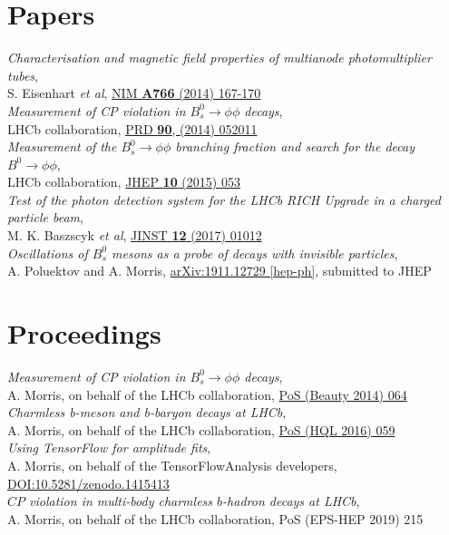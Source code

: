 \documentclass[contbibnum,titleabove]{simplecv}
\begin{document}
	\section{Papers}
	\vspace{0.5em}
		\textit{Characterisation and magnetic field properties of multianode photomultiplier tubes},\\ S. Eisenhart \textit{et al}, \href{http://dx.doi.org/10.1016/j.nima.2014.05.036}{NIM \textbf{A766} (2014) 167-170}\\[1ex]
		\textit{Measurement of CP violation in $B^0_s \to \phi\phi$ decays},\\ LHCb collaboration, \href{http://dx.doi.org/10.1103/PhysRevD.90.052011}{PRD \textbf{90}, (2014) 052011}\\[1ex]
		\textit{Measurement of the $B^0_s \to \phi\phi$ branching fraction and search for the decay $B^0 \to \phi \phi$},\\ LHCb collaboration, \href{http://dx.doi.org/10.1007/JHEP10(2015)053}{JHEP \textbf{10} (2015) 053}\\[1ex]
		\textit{Test of the photon detection system for the LHCb RICH Upgrade in a charged particle beam},\\ M. K. Baszscyk \textit{et al}, \href{http://cds.cern.ch/record/2197586}{JINST \textbf{12} (2017) 01012}\\[1ex]
		\textit{Oscillations of $B_s^0$ mesons as a probe of decays with invisible particles},\\ A. Poluektov and A. Morris, \href{https://arxiv.org/abs/1911.12729}{arXiv:1911.12729 [hep-ph]}, submitted to JHEP
	\section{Proceedings}
	\vspace{0.5em}
		\textit{Measurement of CP violation in $B^0_s \to \phi\phi$ decays},\\ A. Morris, on behalf of the LHCb collaboration, \href{https://pos.sissa.it/cgi-bin/reader/contribution.cgi?id=216/064}{PoS (Beauty 2014) 064}\\[1ex]
		\textit{Charmless b-meson and b-baryon decays at LHCb},\\ A. Morris, on behalf of the LHCb collaboration, \href{https://pos.sissa.it/cgi-bin/reader/contribution.cgi?id=274/059}{PoS (HQL 2016) 059}\\[1ex]
		\textit{Using TensorFlow for amplitude fits},\\ A. Morris, on behalf of the TensorFlowAnalysis developers, \href{https://doi.org/10.5281/zenodo.1415413}{DOI:10.5281/zenodo.1415413}\\[1ex]
		\textit{$C\!P$ violation in multi-body charmless $b$-hadron decays at LHCb},\\ A. Morris, on behalf of the LHCb collaboration, PoS (EPS-HEP 2019) 215
\end{document}
